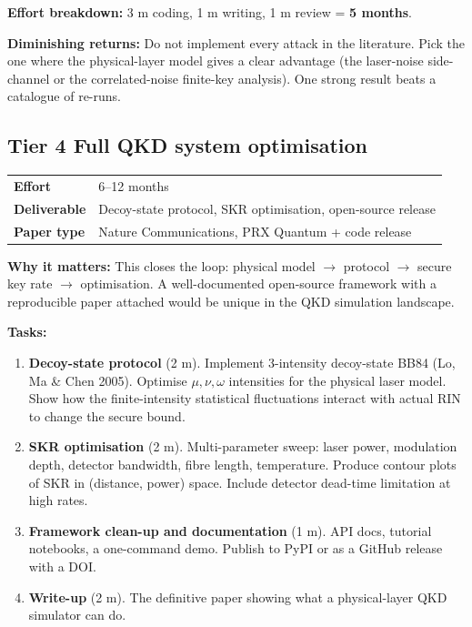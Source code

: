 \documentclass[11pt,a4paper]{article}
\begin{document}
\vspace{4pt}
\noindent\textbf{Effort breakdown:} 3 m coding, 1 m writing, 1 m review = \textbf{5 months}.

\vspace{4pt}
\noindent\textbf{Diminishing returns:} Do not implement every attack in the literature.
Pick the one where the physical-layer model gives a clear advantage (the laser-noise
side-channel or the correlated-noise finite-key analysis).  One strong result beats a
catalogue of re-runs.

\newpage

\subsection*{\color{tier4}Tier 4 \hfill Full QKD system optimisation}

\begin{tabular}{ll}
\toprule
\textbf{Effort} & 6--12 months \\
\textbf{Deliverable} & Decoy-state protocol, SKR optimisation, open-source release \\
\textbf{Paper type} & Nature Communications, PRX Quantum + code release \\
\bottomrule
\end{tabular}

\vspace{4pt}
\noindent\textbf{Why it matters:} This closes the loop: physical model $\rightarrow$ protocol
$\rightarrow$ secure key rate $\rightarrow$ optimisation.  A well-documented open-source
framework with a reproducible paper attached would be unique in the QKD simulation landscape.

\vspace{4pt}
\noindent\textbf{Tasks:}

\begin{enumerate}[nosep]
    \item \textbf{Decoy-state protocol} (2 m).  Implement 3-intensity decoy-state BB84
          (Lo, Ma \& Chen 2005).  Optimise $\mu, \nu, \omega$ intensities for the physical
          laser model.  Show how the finite-intensity statistical fluctuations interact with
          actual RIN to change the secure bound.

    \item \textbf{SKR optimisation} (2 m).  Multi-parameter sweep: laser power, modulation
          depth, detector bandwidth, fibre length, temperature.  Produce contour plots of
          SKR in (distance, power) space.  Include detector dead-time limitation at high
          rates.

    \item \textbf{Framework clean-up and documentation} (1 m).  API docs, tutorial notebooks,
          a one-command demo.  Publish to PyPI or as a GitHub release with a DOI.

    \item \textbf{Write-up} (2 m).  The definitive paper showing what a physical-layer QKD
          simulator can do.
\end{enumerate}
\end{document}
